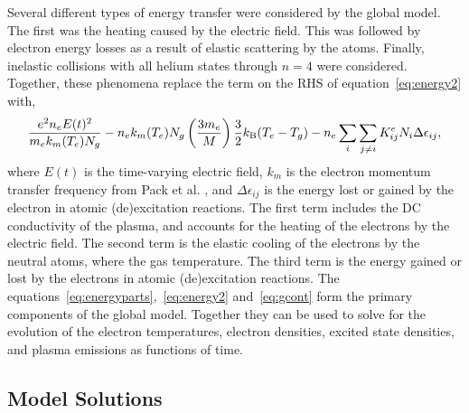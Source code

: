 Several different types of energy transfer were considered by the global model.
The first was the heating caused by the electric field. This was followed by
electron energy losses as a result of elastic scattering by the atoms. Finally,
inelastic collisions with all helium states through $n=4$ were considered.
Together, these phenomena replace the term on the RHS of
equation~\ref{eq:energy2} with,
\begin{equation}
  \frac{e^2n_eE(t)^2}{m_ek_m(T_e)N_g}
  - n_ek_m(T_e)N_g\left(\frac{3m_e}{M}\right)\frac{3}{2}k_\mathrm{B}(T_e-T_g)
  - n_e \sum_i \sum_{j\neq i} K^e_{ij}N_i\Delta\epsilon_{ij},
  \label{eq:energyparts}
\end{equation}
where $E(t)$ is the time-varying electric field, $k_m$ is the electron momentum
transfer frequency from Pack et al. \cite{Pack1992}, and $\Delta\epsilon_{ij}$
is the energy lost or gained by the electron in atomic (de)excitation reactions.
The first term includes the DC conductivity \cite{Lieberman2005} of the plasma,
and accounts for the heating of the electrons by the electric field. The second
term is the elastic cooling of the electrons by the neutral atoms, where the gas
temperature. The third term is the energy gained or lost by the electrons in
atomic (de)excitation reactions. The
equations~\ref{eq:energyparts},~\ref{eq:energy2} and~\ref{eq:gcont} form the
primary components of the global model. Together they can be used to solve for
the evolution of the electron temperatures, electron densities, excited state
densities, and plasma emissions as functions of time.

\subsection{Model Solutions}

